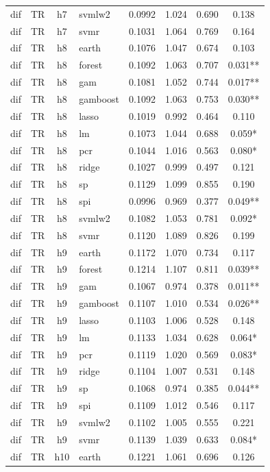 \begin{ThreePartTable}
\begin{longtable}[t]{llclcccc}
dif & TR & h7 & svmlw2 & 0.0992 & 1.024 & 0.690 & 0.138\\
dif & TR & h7 & svmr & 0.1031 & 1.064 & 0.769 & 0.164\\
\addlinespace
dif & TR & h8 & earth & 0.1076 & 1.047 & 0.674 & 0.103\\
dif & TR & h8 & forest & 0.1092 & 1.063 & 0.707 & 0.031**\\
dif & TR & h8 & gam & 0.1081 & 1.052 & 0.744 & 0.017**\\
dif & TR & h8 & gamboost & 0.1092 & 1.063 & 0.753 & 0.030**\\
dif & TR & h8 & lasso & 0.1019 & 0.992 & 0.464 & 0.110\\
dif & TR & h8 & lm & 0.1073 & 1.044 & 0.688 & 0.059*\\
dif & TR & h8 & pcr & 0.1044 & 1.016 & 0.563 & 0.080*\\
dif & TR & h8 & ridge & 0.1027 & 0.999 & 0.497 & 0.121\\
dif & TR & h8 & sp & 0.1129 & 1.099 & 0.855 & 0.190\\
dif & TR & h8 & spi & 0.0996 & 0.969 & 0.377 & 0.049**\\
dif & TR & h8 & svmlw2 & 0.1082 & 1.053 & 0.781 & 0.092*\\
dif & TR & h8 & svmr & 0.1120 & 1.089 & 0.826 & 0.199\\
\addlinespace
dif & TR & h9 & earth & 0.1172 & 1.070 & 0.734 & 0.117\\
dif & TR & h9 & forest & 0.1214 & 1.107 & 0.811 & 0.039**\\
dif & TR & h9 & gam & 0.1067 & 0.974 & 0.378 & 0.011**\\
dif & TR & h9 & gamboost & 0.1107 & 1.010 & 0.534 & 0.026**\\
dif & TR & h9 & lasso & 0.1103 & 1.006 & 0.528 & 0.148\\
dif & TR & h9 & lm & 0.1133 & 1.034 & 0.628 & 0.064*\\
dif & TR & h9 & pcr & 0.1119 & 1.020 & 0.569 & 0.083*\\
dif & TR & h9 & ridge & 0.1104 & 1.007 & 0.531 & 0.148\\
dif & TR & h9 & sp & 0.1068 & 0.974 & 0.385 & 0.044**\\
dif & TR & h9 & spi & 0.1109 & 1.012 & 0.546 & 0.117\\
dif & TR & h9 & svmlw2 & 0.1102 & 1.005 & 0.555 & 0.221\\
dif & TR & h9 & svmr & 0.1139 & 1.039 & 0.633 & 0.084*\\
\addlinespace
dif & TR & h10 & earth & 0.1221 & 1.061 & 0.696 & 0.126\\

\end{longtable}
\end{ThreePartTable}
